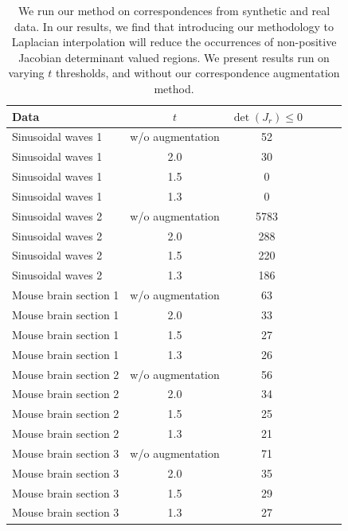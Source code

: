 \begin{table}[ht]
    \caption{We run our method on correspondences from synthetic and real data. In our results, we find that introducing our methodology to Laplacian interpolation will reduce the occurrences of non-positive Jacobian determinant valued regions. We present results run on varying $t$ thresholds, and without our correspondence augmentation method.}
    \label{tab:results}
    \begin{tabular}{lccccc}
    \toprule
    Data & $t$ & $\det{(J_r)} \le 0$ \\
    \hline
    Sinusoidal waves 1 & w/o augmentation & 52 \\ %
    Sinusoidal waves 1 & 2.0 & 30 \\ %
    Sinusoidal waves 1 & 1.5 & 0 \\  %
    Sinusoidal waves 1 & 1.3 & 0 \\  %
    \hline
    Sinusoidal waves 2 & w/o augmentation & 5783 \\ %
    Sinusoidal waves 2 & 2.0 & 288 \\ %
    Sinusoidal waves 2 & 1.5 & 220 \\  %
    Sinusoidal waves 2 & 1.3 & 186 \\  %
    \hline
    Mouse brain section 1 & w/o augmentation & 63  \\ %
    Mouse brain section 1 & 2.0 & 33  \\ %
    Mouse brain section 1 & 1.5 & 27 \\  %
    Mouse brain section 1 & 1.3 & 26 \\  %
    \hline
    Mouse brain section 2 & w/o augmentation & 56  \\ %
    Mouse brain section 2 & 2.0 & 34  \\ %
    Mouse brain section 2 & 1.5 & 25 \\  %
    Mouse brain section 2 & 1.3 & 21 \\ %
    \hline
    Mouse brain section 3 & w/o augmentation & 71  \\ %
    Mouse brain section 3 & 2.0 & 35  \\ %
    Mouse brain section 3 & 1.5 & 29 \\ %
    Mouse brain section 3 & 1.3 & 27 \\ %
    \bottomrule
    \end{tabular}
\end{table}

